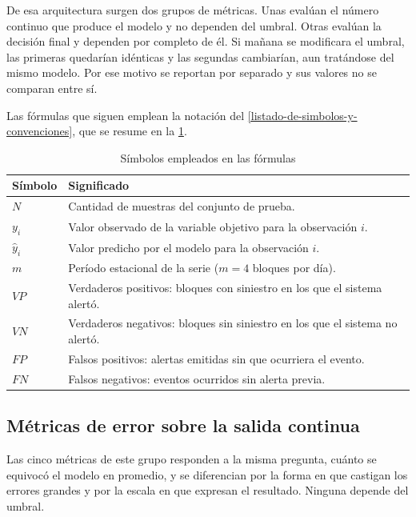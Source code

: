 De esa arquitectura surgen dos grupos de métricas. Unas evalúan el número continuo que produce el modelo y no dependen del umbral. Otras evalúan la decisión final y dependen por completo de él. Si mañana se modificara el umbral, las primeras quedarían idénticas y las segundas cambiarían, aun tratándose del mismo modelo. Por ese motivo se reportan por separado y sus valores no se comparan entre sí.

Las fórmulas que siguen emplean la notación del \cref{listado-de-simbolos-y-convenciones}, que se resume en la \cref{tab:simbolos-formulas}.

\begin{table}[htbp]
\centering
\caption{Símbolos empleados en las fórmulas}
\label{tab:simbolos-formulas}
\begin{tabularx}{\linewidth}{@{}lX@{}}
\toprule
\textbf{Símbolo} & \textbf{Significado} \\
\midrule
$N$ & Cantidad de muestras del conjunto de prueba. \\
$y_i$ & Valor observado de la variable objetivo para la observación $i$. \\
$\hat{y}_i$ & Valor predicho por el modelo para la observación $i$. \\
$m$ & Período estacional de la serie ($m = 4$ bloques por día). \\
$VP$ & Verdaderos positivos: bloques con siniestro en los que el sistema alertó. \\
$VN$ & Verdaderos negativos: bloques sin siniestro en los que el sistema no alertó. \\
$FP$ & Falsos positivos: alertas emitidas sin que ocurriera el evento. \\
$FN$ & Falsos negativos: eventos ocurridos sin alerta previa. \\
\bottomrule
\end{tabularx}
\end{table}

\subsection{Métricas de error sobre la salida continua}

Las cinco métricas de este grupo responden a la misma pregunta, cuánto se equivocó el modelo en promedio, y se diferencian por la forma en que castigan los errores grandes y por la escala en que expresan el resultado. Ninguna depende del umbral.

